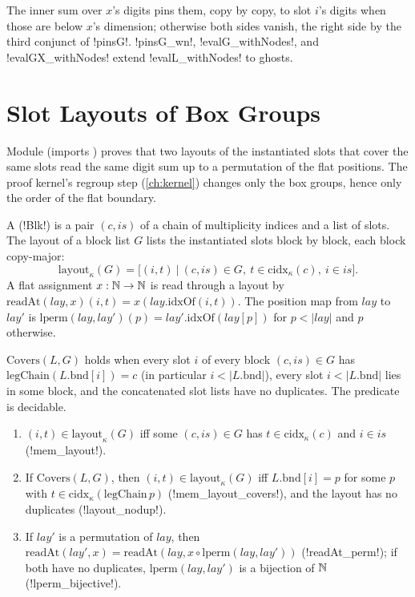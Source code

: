 The inner sum over $x$'s digits pins them, copy by copy, to slot $i$'s digits when those are below $x$'s dimension; otherwise both sides vanish, the right side by the third conjunct of \lean!pinsG!. \lean!pinsG_wn!, \lean!evalG_withNodes!, and \lean!evalGX_withNodes! extend \lean!evalL_withNodes! to ghosts.

\section{Slot Layouts of Box Groups}\label{sec:lean-sym-regroup}

Module  (imports ) proves that two layouts of the instantiated slots that cover the same slots read the same digit sum up to a permutation of the flat positions. The proof kernel's regroup step (\cref{ch:kernel}) changes only the box groups, hence only the order of the flat boundary.

\begin{definition}
A  (\lean!Blk!) is a pair $(c,is)$ of a chain of multiplicity indices and a list of slots. The layout of a block list $G$ lists the instantiated slots block by block, each block copy-major:
\[
\mathrm{layout}_\kappa(G)=\bigl[(i,t)\ \big|\ (c,is)\in G,\ t\in\mathrm{cidx}_\kappa(c),\ i\in is\bigr].
\]
A flat assignment $x:\mathbb{N}\to\mathbb{N}$ is read through a layout by $\mathrm{readAt}(\mathit{lay},x)(i,t)=x(\mathit{lay}.\mathrm{idxOf}(i,t))$. The position map from $\mathit{lay}$ to $\mathit{lay}'$ is $\mathrm{lperm}(\mathit{lay},\mathit{lay}')(p)=\mathit{lay}'.\mathrm{idxOf}(\mathit{lay}[p])$ for $p<|\mathit{lay}|$ and $p$ otherwise.
\end{definition}

\begin{definition}
$\mathrm{Covers}(L,G)$ holds when every slot $i$ of every block $(c,is)\in G$ has $\mathrm{legChain}(L.\mathrm{bnd}[i])=c$ (in particular $i<|L.\mathrm{bnd}|$), every slot $i<|L.\mathrm{bnd}|$ lies in some block, and the concatenated slot lists have no duplicates. The predicate is decidable.
\end{definition}

\begin{theorem}
\begin{enumerate}
\item $(i,t)\in\mathrm{layout}_\kappa(G)$ iff some $(c,is)\in G$ has $t\in\mathrm{cidx}_\kappa(c)$ and $i\in is$ (\lean!mem_layout!).
\item If $\mathrm{Covers}(L,G)$, then $(i,t)\in\mathrm{layout}_\kappa(G)$ iff $L.\mathrm{bnd}[i]=p$ for some $p$ with $t\in\mathrm{cidx}_\kappa(\mathrm{legChain}\,p)$ (\lean!mem_layout_covers!), and the layout has no duplicates (\lean!layout_nodup!).
\item If $\mathit{lay}'$ is a permutation of $\mathit{lay}$, then $\mathrm{readAt}(\mathit{lay}',x)=\mathrm{readAt}(\mathit{lay},x\circ\mathrm{lperm}(\mathit{lay},\mathit{lay}'))$ (\lean!readAt_perm!); if both have no duplicates, $\mathrm{lperm}(\mathit{lay},\mathit{lay}')$ is a bijection of $\mathbb{N}$ (\lean!lperm_bijective!).
\end{enumerate}
\end{theorem}

